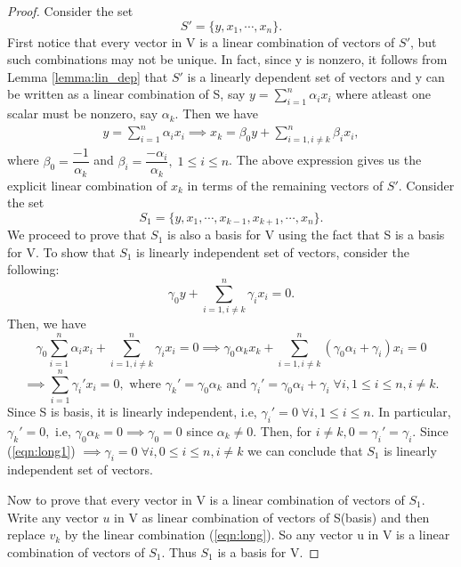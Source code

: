 \documentclass[11pt,a4paper]{article}
\begin{document}
\begin{proof}
    Consider the set 
    $$
        S' = \{y,x_1,\cdots,x_n\}.
    $$
    First notice that every vector in V is a linear combination of vectors of $S'$, but such combinations may not be unique. In fact, since y is nonzero, it follows from Lemma \ref{lemma:lin_dep} that $S'$ is a linearly dependent set of vectors and y can be written as a linear combination of S, say $y=\sum_{i=1}^n\alpha_ix_i$ where atleast one scalar must be nonzero, say $\alpha_k$. Then we have
    \begin{eqnarray}\label{eqn:long}
        y = \sum_{i=1}^n\alpha_ix_i \implies 
        x_k = \beta_0y+\sum_{i=1,i\neq k}^n\beta_ix_i,
    \end{eqnarray}
    where $\beta_0 = \dfrac{-1}{\alpha_k}$ and $\beta_i = \dfrac{-\alpha_i}{\alpha_k},\;1\le i\le n$. The above expression gives us the explicit linear combination of $x_k$ in terms of the remaining vectors of $S'$. Consider the set
    $$
        S_1 = \{y,x_1,\cdots,x_{k-1},x_{k+1},\cdots,x_n\}.
    $$
    We proceed to prove that $S_1$ is also a basis for V using the fact that S is a basis for V. To show that $S_1$ is linearly independent set of vectors, consider the following:
    \begin{equation}\label{eqn:long1}
        \gamma_0y+\sum_{i=1,i\neq k}^n\gamma_ix_i = 0.
    \end{equation}
    Then, we have
    $$
        \gamma_0\sum_{i=1}^n\alpha_ix_i+\sum_{i=1,i\neq k}^n\gamma_ix_i = 0 
        \implies \gamma_0\alpha_kx_k+\sum_{i=1,i\neq k}^n(\gamma_0\alpha_i+\gamma_i)x_i = 0 
    $$
    $$  
        \implies\sum_{i=1}^n\gamma_i' x_i = 0,\text{ where }\gamma_k' = \gamma_0\alpha_k\text{ and }\gamma_i' = \gamma_0\alpha_i+\gamma_i\;\forall i,1\le i\le n,i\neq k.
    $$
    Since S is basis, it is linearly independent, i.e, $\gamma_i' = 0\;\forall i,1\le i\le n$. In particular, $\gamma_k' = 0,$ i.e, $\gamma_0\alpha_k=0\implies \gamma_0=0$ since $\alpha_k\neq 0$. Then, for $i\neq k,0 = \gamma_i' = \gamma_i$. Since (\ref{eqn:long1}) $\implies\gamma_i=0\;\forall i,0\le i\le n,i\neq k$ we can conclude that $S_1$ is linearly independent set of vectors.

    Now to prove that every vector in V is a linear combination of vectors of $S_1$. Write any vector $u$ in V as linear combination of vectors of S(basis) and then replace $v_k$ by the linear combination (\ref{eqn:long}). So any vector u in V is a linear combination of vectors of $S_1$. Thus $S_1$ is a basis for V.
\end{proof}
\end{document}
